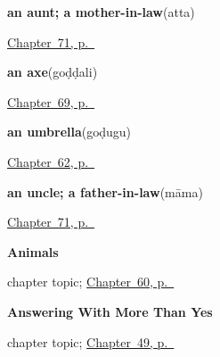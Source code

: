 \noindent\begin{minipage}[t]{\linewidth}
\raggedright
\textbf{an aunt; a mother-in-law}\enspace\emph{}\enspace(atta)\par
\footnotesize \hyperref[ch:te-the-wider-family]{Chapter~71, p.~\pageref*{ch:te-the-wider-family}}
\end{minipage}\par\smallskip

\noindent\begin{minipage}[t]{\linewidth}
\raggedright
\textbf{an axe}\enspace\emph{}\enspace(goḍḍali)\par
\footnotesize \hyperref[ch:te-tools]{Chapter~69, p.~\pageref*{ch:te-tools}}
\end{minipage}\par\smallskip

\noindent\begin{minipage}[t]{\linewidth}
\raggedright
\textbf{an umbrella}\enspace\emph{}\enspace(goḍugu)\par
\footnotesize \hyperref[ch:te-made-things]{Chapter~62, p.~\pageref*{ch:te-made-things}}
\end{minipage}\par\smallskip

\noindent\begin{minipage}[t]{\linewidth}
\raggedright
\textbf{an uncle; a father-in-law}\enspace\emph{}\enspace(māma)\par
\footnotesize \hyperref[ch:te-the-wider-family]{Chapter~71, p.~\pageref*{ch:te-the-wider-family}}
\end{minipage}\par\smallskip

\noindent\begin{minipage}[t]{\linewidth}
\raggedright
\textbf{Animals}\par
\footnotesize chapter topic; \hyperref[ch:te-animals]{Chapter~60, p.~\pageref*{ch:te-animals}}
\end{minipage}\par\smallskip

\noindent\begin{minipage}[t]{\linewidth}
\raggedright
\textbf{Answering With More Than Yes}\par
\footnotesize chapter topic; \hyperref[ch:te-replies]{Chapter~49, p.~\pageref*{ch:te-replies}}
\end{minipage}\par\smallskip

